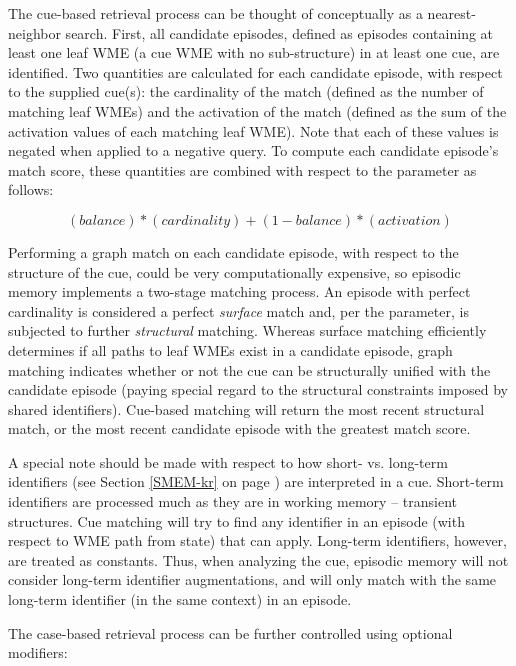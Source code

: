 The cue-based retrieval process can be thought of conceptually as a nearest-neighbor search. 
First, all candidate episodes, defined as episodes containing at least one leaf WME (a cue WME with no sub-structure) in at least one cue, are identified.  
Two quantities are calculated for each candidate episode, with respect to the supplied cue(s): the cardinality of the match (defined as the number of matching leaf WMEs) and the activation of the match (defined as the sum of the activation values of each matching leaf WME).  
Note that each of these values is negated when applied to a negative query.  
To compute each candidate episode's match score, these quantities are combined with respect to the  parameter as follows:

$$(balance)*(cardinality) + (1-balance)*(activation)$$

Performing a graph match on each candidate episode, with respect to the structure of the cue, could be very computationally expensive, so episodic memory implements a two-stage matching process.
An episode with perfect cardinality is considered a perfect \emph{surface} match and, per the  parameter, is subjected to further \emph{structural} matching.  
Whereas surface matching efficiently determines if all paths to leaf WMEs exist in a candidate episode, graph matching indicates whether or not the cue can be structurally unified with the candidate episode (paying special regard to the structural constraints imposed by shared identifiers).  
Cue-based matching will return the most recent structural match, or the most recent candidate episode with the greatest match score.

A special note should be made with respect to how short- vs. long-term identifiers (see Section \ref{SMEM-kr} on page \pageref{SMEM-kr}) are interpreted in a cue.  
Short-term identifiers are processed much as they are in working memory -- transient structures.  
Cue matching will try to find any identifier in an episode (with respect to WME path from state) that can apply.  
Long-term identifiers, however, are treated as constants. 
Thus, when analyzing the cue, episodic memory will not consider long-term identifier augmentations, and will only match with the same long-term identifier (in the same context) in an episode.

The case-based retrieval process can be further controlled using optional modifiers:


